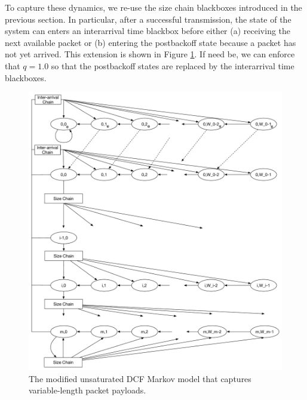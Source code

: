 \documentclass{llncs}
\begin{document}
To capture these dynamics, we re-use the size chain blackboxes introduced in the previous section. In particular, after a successful transmission, the state of the system can enters an interarrival time blackbox before either (a) receiving the next available packet or (b) entering the postbackoff state because a packet has not yet arrived. This extension is shown in Figure \ref{fig:dcf_model_unsaturated_varpktsize_interarrival}. If need be, we can enforce that $q = 1.0$ so that the postbackoff states are replaced by the interarrival time blackboxes. 

\begin{figure}
\begin{center}
\includegraphics[scale=0.35]{../../sketches/dcf_model_unsaturated_varpktsize_interarrival.pdf}
\caption{The modified unsaturated DCF Markov model that captures variable-length packet payloads.}
\label{fig:dcf_model_unsaturated_varpktsize_interarrival}
\end{center}
\end{figure}




\end{document}
